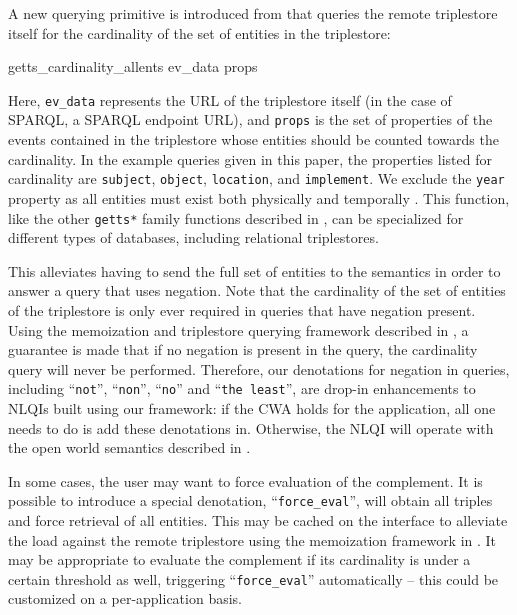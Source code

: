 \documentclass[../main.tex]{subfiles}
\begin{document}
\begin{refsection}
A new querying primitive is introduced from \cite{peelar2020webistjournal} that queries the remote triplestore itself for the cardinality of the set of entities in the triplestore:
\begin{code}
    getts_cardinality_allents ev_data props
\end{code}
Here, \texttt{ev\_data} represents the URL of the triplestore itself (in the case of SPARQL, a SPARQL endpoint URL), and \texttt{props} is the set of properties of the events contained in the triplestore whose entities should be counted towards the cardinality.  In the example queries given in this paper, the properties listed for cardinality are \texttt{subject}, \texttt{object}, \texttt{location}, and \texttt{implement}.  We exclude the \texttt{year} property as all entities must exist both physically and temporally \cite{w3csemanticweb}.  This function, like the other  \texttt{getts*} family functions described in \cite{frostpeelar2019}, can be specialized for different types of databases, including relational triplestores.

This alleviates having to send the full set of entities to the semantics in order to answer a query that uses negation. Note that the cardinality of the set of entities of the triplestore is only ever required in queries that have negation present.  Using the memoization and triplestore querying framework described in \cite{peelar2020webistjournal}, a guarantee is made that if no negation is present in the query, the cardinality query will never be performed.  Therefore, our denotations for negation in queries, including ``\texttt{not}'', ``\texttt{non}'', ``\texttt{no}'' and ``\texttt{the least}'', are drop-in enhancements to NLQIs built using our framework: if the CWA holds for the application, all one needs to do is add these denotations in.  Otherwise, the NLQI will operate with the open world semantics described in \cite{frostpeelar2019}.

In some cases, the user may want to force evaluation of the complement.  It is possible to introduce a special denotation, ``\texttt{force\_eval}'', will obtain all triples and force retrieval of all entities.  This may be cached on the interface to alleviate the load against the remote triplestore using the memoization framework in \cite{frostpeelar2019}.  It may be appropriate to evaluate the complement if its cardinality is under a certain threshold as well, triggering ``\texttt{force\_eval}'' automatically -- this could be customized on a per-application basis.


\end{refsection}
\end{document}
